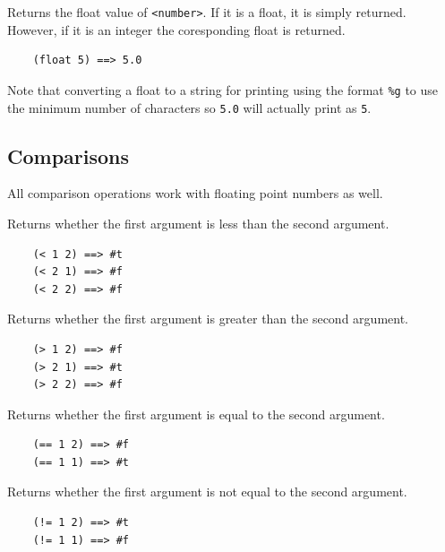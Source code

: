 \documentclass[12pt]{article}
\begin{document}

Returns the float value of \verb|<number>|. If it is a float, it
is simply returned. However, if it is an integer the coresponding float is
returned.

\begin{verbatim}
    (float 5) ==> 5.0
\end{verbatim}

Note that converting a float to a string for printing using the format
\verb|%g| to use the minimum number of characters so \verb|5.0| will
actually print as \verb|5|.

\subsection{Comparisons}

All comparison operations work with floating point numbers as well.


Returns whether the first argument is less than the second argument.

\begin{verbatim}
    (< 1 2) ==> #t
    (< 2 1) ==> #f
    (< 2 2) ==> #f
\end{verbatim}


Returns whether the first argument is greater than the second argument.

\begin{verbatim}
    (> 1 2) ==> #f
    (> 2 1) ==> #t
    (> 2 2) ==> #f
\end{verbatim}


Returns whether the first argument is equal to the second argument.

\begin{verbatim}
    (== 1 2) ==> #f
    (== 1 1) ==> #t
\end{verbatim}


Returns whether the first argument is not equal to the second argument.

\begin{verbatim}
    (!= 1 2) ==> #t
    (!= 1 1) ==> #f
\end{verbatim}
\end{document}
